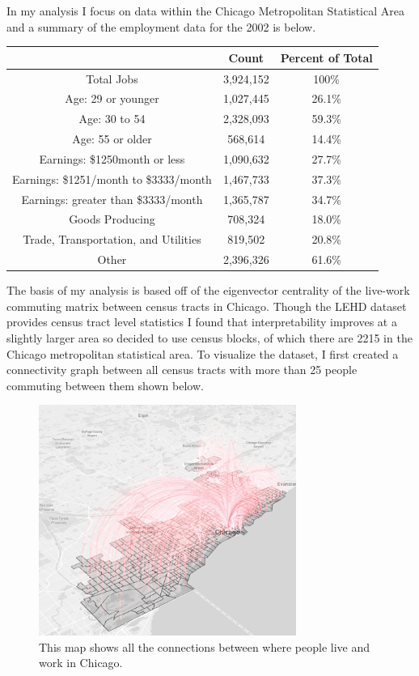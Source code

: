 \documentclass{article}
\begin{document}
In my analysis I focus on data within the Chicago Metropolitan Statistical Area and a summary of the employment data for the 2002 is below. \\
\begin{center}
 \begin{tabular}{|| c | c | c||} 
 \hline
 & Count & Percent of Total \\[0.5ex] 
 \hline\hline
 Total Jobs & 3,924,152  & 100\% \\  \hline
 Age: 29 or younger & 1,027,445 & 26.1\% \\ 
 Age: 30 to 54 & 2,328,093 & 59.3\% \\
 Age: 55 or older & 568,614 & 14.4\% \\ \hline
 Earnings: \$1250month or less & 1,090,632 & 27.7\% \\ 
 Earnings: \$1251/month to \$3333/month  & 1,467,733 & 37.3\% \\ 
 Earnings: greater than \$3333/month & 1,365,787 & 34.7\% \\ \hline
 Goods Producing  & 708,324 & 18.0\% \\ 
 Trade, Transportation, and Utilities  & 819,502 & 20.8\% \\ 
 Other  & 2,396,326 & 61.6\% \\ \hline 
\end{tabular}
\end{center}

The basis of my analysis is based off of the eigenvector centrality of the live-work commuting matrix between census tracts in Chicago.  Though the LEHD dataset provides census tract level statistics I found that interpretability improves at a slightly larger area so decided to use census blocks, of which there are 2215 in the Chicago metropolitan statistical area. To visualize the dataset, I first created a connectivity graph between all census tracts with more than 25 people commuting between them shown below.\\


\begin{figure}[H]
    \centering
    \includegraphics[width=0.75\textwidth]{arc-1}
    \caption{This map shows all the connections between where people live and work in Chicago.}
    \label{fig:arc-1}
\end{figure}
\end{document}
